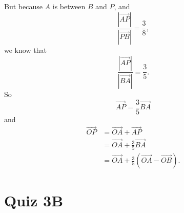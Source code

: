 \documentclass{ximera}
\begin{document}
\begin{question}
\begin{explanation}
But because $A$ is between $B$ and $P$,
and
\[
  \frac{\left| \overrightarrow{AP} \right|}{\left| \overrightarrow{PB} \right|} = \frac{3}{8} ,
\]
we know that
\[
    \frac{\left| \overrightarrow{AP} \right|}{\left| \overrightarrow{BA} \right|} = \frac{3}{5}.
\]
So
\[
  \overrightarrow{AP} = \frac{3}{5} \overrightarrow{BA}
\]
and
\begin{align*}
   \overrightarrow{OP} &= \overrightarrow{OA} +\overrightarrow{AP}  \\
                                 &=  \overrightarrow{OA} +\frac{3}{5} \overrightarrow{BA} \\
                                 &=  \overrightarrow{OA} +\frac{3}{5} \left(    \overrightarrow{OA} - \overrightarrow{OB}  \right).
\end{align*}

\end{explanation}

\end{question}



\section{Quiz 3B}
\end{document}
